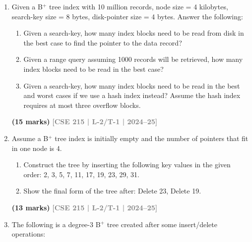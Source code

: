 \documentclass[12pt]{article}
\newcommand{\yr}[1]{\hfill\textcolor{gray}{\small\textbf{[#1]}}}
\newcommand{\mk}[1]{\textcolor{orange!70!black}{\small\textbf{(#1 marks)}}}
\begin{document}
\begin{enumerate}

\item Given a B$^+$ tree index with 10 million records, node size = 4 kilobytes, search-key size = 8 bytes, disk-pointer size = 4 bytes. Answer the following:
\begin{enumerate}
  \item Given a search-key, how many index blocks need to be read from disk in the best case to find the pointer to the data record?
  \item Given a range query assuming 1000 records will be retrieved, how many index blocks need to be read in the best case?
  \item Given a search-key, how many index blocks need to be read in the best and worst cases if we use a hash index instead? Assume the hash index requires at most three overflow blocks.
\end{enumerate}
\mk{15} \yr{CSE 215 | L-2/T-1 | 2024--25}



\item Assume a B$^+$ tree index is initially empty and the number of pointers that fit in one node is 4.
\begin{enumerate}
  \item Construct the tree by inserting the following key values in the given order: 2, 3, 5, 7, 11, 17, 19, 23, 29, 31.
  \item Show the final form of the tree after: Delete 23, Delete 19.
\end{enumerate}
\mk{13} \yr{CSE 215 | L-2/T-1 | 2024--25}


\item The following is a degree-3 B$^+$ tree created after some insert/delete operations:
\begin{center}

\end{center}
\end{enumerate}
\end{document}
